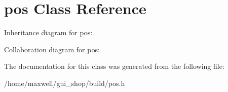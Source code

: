 \hypertarget{classpos}{}\section{pos Class Reference}
\label{classpos}


Inheritance diagram for pos\+:


Collaboration diagram for pos\+:


The documentation for this class was generated from the following file\+:\begin{DoxyCompactItemize}
\item 
/home/maxwell/gui\+\_\+shop/build/pos.\+h\end{DoxyCompactItemize}
